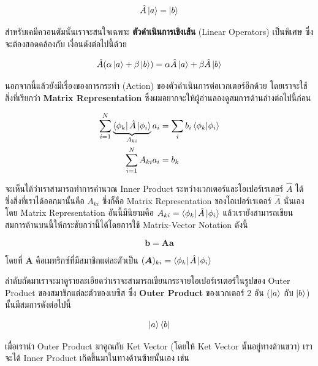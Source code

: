 \begin{equation}
  \label{eq:operator}
  \hat{A} \ket{a}
  =
  \ket{b}
\end{equation}

\noindent สำหรับเคมีควอนตัมนั้นเราจะสนใจเฉพาะ \textbf{ตัวดำเนินการเชิงเส้น} (Linear Operators) เป็นพิเศษ ซึ่งจะต้องสอดคล้องกับ%
เงื่อนดังต่อไปนี้ด้วย

\begin{equation}
  \hat{A} (\alpha \ket{a} + \beta \ket{b})
  =
  \alpha \hat{A} \ket{a} + \beta \hat{A} \ket{b}
\end{equation}

นอกจากนี้แล้วยังมีเรื่องของการกระทำ (Action) ของตัวดำเนินการต่อเวกเตอร์อีกด้วย โดยเราจะใช้สิ่งที่เรียกว่า \textbf{Matrix Representation}
ซึ่งผมอยากจะให้ผู้อ่านลองดูสมการด้านล่างต่อไปนี้ก่อน


\begin{equation}
  \begin{split}
    \sum_{i = 1}^N \underbrace{\bra{\phi_k}\hat{A} \ket{\phi_i}}_{A_{ki} } a_i
    &=
    \sum_i b_i \braket{\phi_k}{\phi_i} \\
    \sum_{i = 1}^N A_{ki} a_i
    &=
    b_k
  \end{split}
\end{equation}

\noindent จะเห็นได้ว่าเราสามารถทำการคำนวณ Inner Product ระหว่างเวกเตอร์และโอเปอร์เรเตอร์ $\hat{A}$ ได้ ซึ่งสิ่งที่เราได้ออกมานั้นคือ
$A_{ki}$ ซึ่งก็คือ Matrix Representation ของโอเปอร์เรเตอร์ $\hat{A}$ นั่นเอง โดย Matrix Representation อันนี้มีนิยามคือ
$A_{ki} = \bra{\phi_k}\hat{A} \ket{\phi_i}$ แล้วเรายังสามารถเขียนสมการด้านบนนี้ให้กระชับกว่านี้ได้โดยการใช้ Matrix-Vector
Notation ดังนี้

\begin{equation}
  \bm{b}
  =
  \bm{A} \bm{a}
\end{equation}

\noindent โดยที่ $\bm{A}$ คือเมทริกซ์ที่มีสมาชิกแต่ละตัวเป็น $(\bm{A})_{ki} = \bra{\phi_k}\hat{A} \ket{\phi_i}$

ลำดับถัดมาเราจะมาดูรายละเอียดว่าเราจะสามารถเขียนกระจายโอเปอร์เรเตอร์ในรูปของ Outer Product ของสมาชิกแต่ละตัวของเบซิส ซึ่ง
\textbf{Outer Product} ของเวกเตอร์ 2 อัน ($\ket{a}$ กับ $\ket{b}$) นั้นมีสมการดังต่อไปนี้

\begin{equation}
  \ket{a}\bra{b}
\end{equation}

\noindent เมื่อเรานำ Outer Product มาคูณกับ Ket Vector (โดยให้ Ket Vector นั้นอยู่ทางด้านขวา) เราจะได้ Inner Product
เกิดขึ้นมาในทางด้านซ้ายนั้นเอง เช่น


